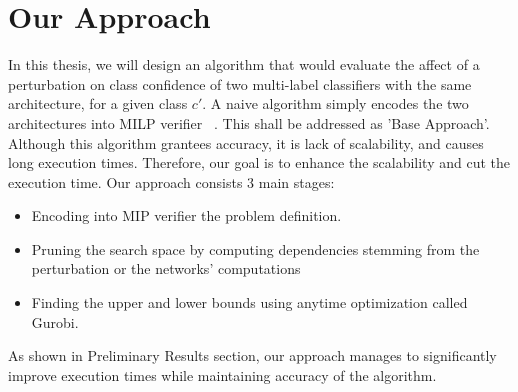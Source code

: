 
\section{Our Approach}

In this thesis, we will design an algorithm that would evaluate the affect of a perturbation on class confidence of two multi-label classifiers with the same architecture, for a given class $c'$. A naive algorithm simply encodes the two architectures into MILP verifier ~\cite{MIPVERIFY}. This shall be addressed as 'Base Approach'. Although this algorithm grantees accuracy, it is lack of scalability, and causes long execution times. Therefore, our goal is to enhance the scalability and cut the execution time. Our approach consists 3 main stages:
\begin{itemize}
    \item Encoding into MIP verifier the problem definition.
    \item Pruning the search space by computing dependencies stemming from the perturbation or the networks' computations
    \item Finding the upper and lower bounds using anytime optimization called Gurobi.
\end{itemize}
As shown in Preliminary Results section, our approach manages to significantly improve execution times while maintaining accuracy of the algorithm.

